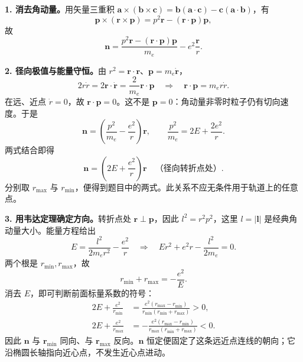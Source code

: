 \begin{checkedsolution}
\textbf{1. 消去角动量。}用矢量三重积
$\mathbf a\times(\mathbf b\times\mathbf c)
=\mathbf b(\mathbf a\cdot\mathbf c)-\mathbf c(\mathbf a\cdot\mathbf b)$，有
\begin{equation}
  \mathbf p\times(\mathbf r\times\mathbf p)
   =p^2\mathbf r-(\mathbf r\cdot\mathbf p)\mathbf p,
\end{equation}
故
\begin{equation}
  \boxed{\mathbf n=\frac{p^2\mathbf r-(\mathbf r\cdot\mathbf p)\mathbf p}{m_e}
       -e^2\frac{\mathbf r}{r}.}
\end{equation}

\textbf{2. 径向极值与能量守恒。}由 $r^2=\mathbf r\cdot\mathbf r$、$\mathbf p=m_e\dot{\mathbf r}$，
\begin{equation}
  2r\dot r=2\mathbf r\cdot\dot{\mathbf r}
    =\frac2{m_e}\mathbf r\cdot\mathbf p
  \quad\Longrightarrow\quad
  \boxed{\mathbf r\cdot\mathbf p=m_er\dot r.}
\end{equation}
在远、近点 $\dot r=0$，故 $\mathbf r\cdot\mathbf p=0$。这不是 $\mathbf p=0$：角动量非零时粒子仍有切向速度。于是
\begin{equation}
  \mathbf n=\left(\frac{p^2}{m_e}-\frac{e^2}{r}\right)\mathbf r,
  \qquad \frac{p^2}{m_e}=2E+\frac{2e^2}{r}.
\end{equation}
两式结合即得
\begin{equation}
  \boxed{\mathbf n=\left(2E+\frac{e^2}{r}\right)\mathbf r
    \quad\text{（径向转折点处）}.}
\end{equation}
分别取 $r_{\max}$ 与 $r_{\min}$，便得到题目中的两式。此关系不应无条件用于轨道上的任意点。

\textbf{3. 用韦达定理确定方向。}转折点处 $\mathbf r\perp\mathbf p$，因此 $l^2=r^2p^2$，这里 $l=|\mathbf l|$ 是经典角动量大小。能量方程给出
\begin{equation}
  E=\frac{l^2}{2m_er^2}-\frac{e^2}{r}
  \quad\Longrightarrow\quad
  Er^2+e^2r-\frac{l^2}{2m_e}=0.
\end{equation}
两个根是 $r_{\min},r_{\max}$，故
\begin{equation}
  r_{\min}+r_{\max}=-\frac{e^2}{E}.
\end{equation}
消去 $E$，即可判断前面标量系数的符号：
\begin{align}
  2E+\frac{e^2}{r_{\min}}
    &=\frac{e^2(r_{\max}-r_{\min})}
      {r_{\min}(r_{\min}+r_{\max})}>0,\\
  2E+\frac{e^2}{r_{\max}}
    &=-\frac{e^2(r_{\max}-r_{\min})}
      {r_{\max}(r_{\min}+r_{\max})}<0.
\end{align}
因此 $\mathbf n$ 与 $\mathbf r_{\min}$ 同向、与 $\mathbf r_{\max}$ 反向。$\mathbf n$ 恒定便固定了这条远近点连线的朝向；它沿椭圆长轴指向近心点，不发生近心点进动。


\end{checkedsolution}
